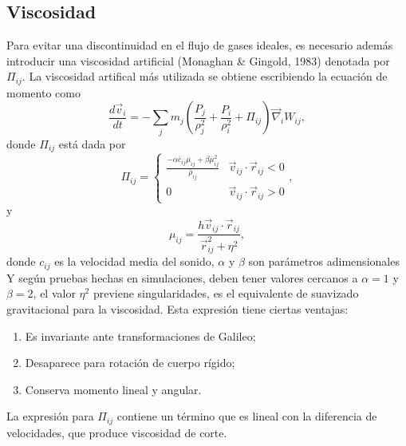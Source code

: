 \documentclass[a4paper,openright,12pt]{book}
\begin{document}
\subsection{Viscosidad}
Para evitar una discontinuidad en el flujo de gases ideales, es necesario además introducir una viscosidad artificial (Monaghan \& Gingold, 1983) \cite{b9.2} denotada por $\Pi_{ij}$. La viscosidad artifical más utilizada se obtiene escribiendo la ecuación de momento como
\begin{equation}
\frac{d \vec{v}_{i}}{d t}
=
- \sum_{j} m_{j} 
\left(\frac{P_{j}}{\rho_{j}^{2}}+ \frac{P_{i}}{\rho_{i}^{2}} + \Pi_{ij}\right)
\vec{\nabla}_{i}W_{ij}, \label{eqn 2.40}
\end{equation}
donde $\Pi_{ij}$ está dada por
\begin{equation}
\Pi_{ij} = \left\lbrace
\begin{array}{ll}
\frac{-\alpha \bar{c}_{ij}\mu_{ij}+\beta\mu_{ij}^{2}}{\bar{\rho}_{ij}}  & \vec{v}_{ij}\cdot\vec{r}_{ij} < 0\\

0  & \vec{v}_{ij}\cdot\vec{r}_{ij} > 0
\end{array}
\right.,\label{eqn 2.41}
\end{equation}
y 
\begin{equation}
\mu_{ij}=\frac{h\vec{v}_{ij}\cdot\vec{r}_{ij}}{\vec{r}_{ij}^{2}+\eta^{2}},\label{eqn 2.42}
\end{equation}
donde $c_{ij}$ es la velocidad media del sonido, $\alpha$ y $\beta$ son parámetros adimensionales Y según pruebas hechas en simulaciones, deben tener valores cercanos a $\alpha=1$ y $\beta=2$, el valor $\eta^{2}$ previene singularidades, es el equivalente de suavizado gravitacional para la viscosidad. Esta expresión tiene ciertas ventajas:
\begin{enumerate}
\item Es invariante ante transformaciones de Galileo;
\item Desaparece para rotación de cuerpo rígido;
\item Conserva momento lineal y angular.
\end{enumerate}
La expresión para $\Pi_{ij}$ contiene un término que es lineal con la diferencia de velocidades, que produce viscosidad de corte.
\end{document}

